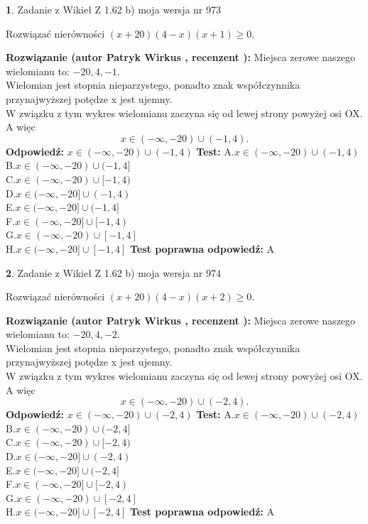 \documentclass[12pt, a4paper]{article}
\theoremstyle{definition} %
\newtheorem{zad}{}
\newcommand{\zadStart}[1]{\begin{zad}#1\newline}
\newcommand{\zadStop}{\end{zad}}
\newcommand{\rozwStart}[2]{\noindent \textbf{Rozwiązanie (autor #1 , recenzent #2): }\newline}
\newcommand{\rozwStop}{\newline}
\newcommand{\odpStart}{\noindent \textbf{Odpowiedź:}\newline}
\newcommand{\odpStop}{\newline}
\newcommand{\testStart}{\noindent \textbf{Test:}\newline}
\newcommand{\testStop}{\newline}
\newcommand{\kluczStart}{\noindent \textbf{Test poprawna odpowiedź:}\newline}
\newcommand{\kluczStop}{\newline}
\begin{document}
\zadStart{Zadanie z Wikieł Z 1.62 b) moja wersja nr 973}

Rozwiązać nierówności $(x+20)(4-x)(x+1)\ge0$.
\zadStop
\rozwStart{Patryk Wirkus}{}
Miejsca zerowe naszego wielomianu to: $-20, 4, -1$.\\
Wielomian jest stopnia nieparzystego, ponadto znak współczynnika przy\linebreak najwyższej potędze x jest ujemny.\\ W związku z tym wykres wielomianu zaczyna się od lewej strony powyżej osi OX. A więc $$x \in (-\infty,-20) \cup (-1,4).$$
\rozwStop
\odpStart
$x \in (-\infty,-20) \cup (-1,4)$
\odpStop
\testStart
A.$x \in (-\infty,-20) \cup (-1,4)$\\
B.$x \in (-\infty,-20) \cup (-1,4]$\\
C.$x \in (-\infty,-20) \cup [-1,4)$\\
D.$x \in (-\infty,-20] \cup (-1,4)$\\
E.$x \in (-\infty,-20] \cup (-1,4]$\\
F.$x \in (-\infty,-20] \cup [-1,4)$\\
G.$x \in (-\infty,-20) \cup [-1,4]$\\
H.$x \in (-\infty,-20] \cup [-1,4]$
\testStop
\kluczStart
A
\kluczStop



\zadStart{Zadanie z Wikieł Z 1.62 b) moja wersja nr 974}

Rozwiązać nierówności $(x+20)(4-x)(x+2)\ge0$.
\zadStop
\rozwStart{Patryk Wirkus}{}
Miejsca zerowe naszego wielomianu to: $-20, 4, -2$.\\
Wielomian jest stopnia nieparzystego, ponadto znak współczynnika przy\linebreak najwyższej potędze x jest ujemny.\\ W związku z tym wykres wielomianu zaczyna się od lewej strony powyżej osi OX. A więc $$x \in (-\infty,-20) \cup (-2,4).$$
\rozwStop
\odpStart
$x \in (-\infty,-20) \cup (-2,4)$
\odpStop
\testStart
A.$x \in (-\infty,-20) \cup (-2,4)$\\
B.$x \in (-\infty,-20) \cup (-2,4]$\\
C.$x \in (-\infty,-20) \cup [-2,4)$\\
D.$x \in (-\infty,-20] \cup (-2,4)$\\
E.$x \in (-\infty,-20] \cup (-2,4]$\\
F.$x \in (-\infty,-20] \cup [-2,4)$\\
G.$x \in (-\infty,-20) \cup [-2,4]$\\
H.$x \in (-\infty,-20] \cup [-2,4]$
\testStop
\kluczStart
A
\kluczStop
\end{document}
